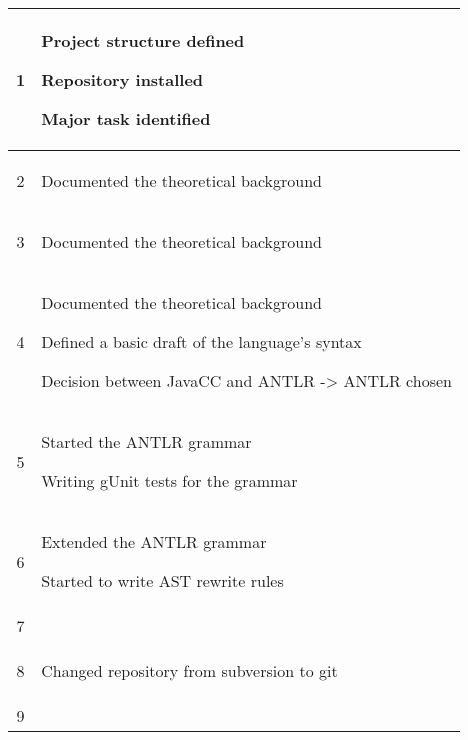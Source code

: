 \begin{center}
\begin{longtable}{|c|p{12cm}|}
1 & 
\begin{journal}
	\item Project structure defined
	\item Repository installed
	\item Major task identified
\end{journal}
\\ \hline
2 & 
\begin{journal}
	\item Documented the theoretical background
\end{journal}
\\ \hline
3 & 
\begin{journal}
	\item Documented the theoretical background
\end{journal}
\\ \hline
4 & 
\begin{journal}
	\item Documented the theoretical background
	\item Defined a basic draft of the language's syntax
	\item Decision between JavaCC and ANTLR -> ANTLR chosen
\end{journal}
\\ \hline
5 & 
\begin{journal}
	\item Started the ANTLR grammar
	\item Writing gUnit tests for the grammar
\end{journal}
\\ \hline
6 & 
\begin{journal}
	\item Extended the ANTLR grammar
	\item Started to write AST rewrite rules
\end{journal}
\\ \hline
7 & 
\begin{journal}
	\item 
\end{journal}
\\ \hline
8 & 
\begin{journal}
	\item Changed repository from subversion to git
\end{journal}
\\ \hline
9 & 
\begin{journal}
	\item 
\end{journal}
\\ \hline

\end{longtable}
\end{center}
